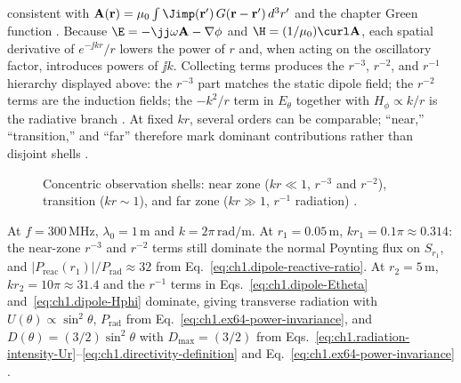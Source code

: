 consistent with $\mathbf{A}(\mathbf{r})=\mu_0\int \Jimp(\mathbf{r}')\,G(\mathbf{r}-\mathbf{r}')\,d^{3}r'$ and the chapter Green function \cite{stratton1941,harrington2001,orfanidis2014}. Because $\E=-\jj\omega\mathbf{A}-\nabla\phi$ and $\H=(1/\mu_0)\curl\mathbf{A}$, each spatial derivative of $e^{-\jj kr}/r$ lowers the power of $r$ and, when acting on the oscillatory factor, introduces powers of $\jj k$. Collecting terms produces the $r^{-3}$, $r^{-2}$, and $r^{-1}$ hierarchy displayed above: the $r^{-3}$ part matches the static dipole field; the $r^{-2}$ terms are the induction fields; the $-k^2/r$ term in $E_\theta$ together with $H_\phi\propto k/r$ is the radiative branch \cite{stratton1941}. At fixed $kr$, several orders can be comparable; ``near,'' ``transition,'' and ``far'' therefore mark dominant contributions rather than disjoint shells \cite{stratton1941,poynting1884}.

\begin{figure}[t]
\centering
\VolIPhysFig{\VolIPhysDipoleThreeZones}
\caption{Concentric observation shells: near zone ($kr\ll1$, $r^{-3}$ and $r^{-2}$), transition ($kr\sim1$), and far zone ($kr\gg1$, $r^{-1}$ radiation) \cite{stratton1941,poynting1884}.}
\label{fig:ch1.dipole-three-zones}
\end{figure}

\begin{example}
\label{ex:ch1.dipole-kr}
At $f=300\,\mathrm{MHz}$, $\lambda_0=1\,\mathrm{m}$ and $k=2\pi\,\mathrm{rad/m}$. At $r_1=0.05\,\mathrm{m}$, $kr_1=0.1\pi\approx0.314$: the near-zone $r^{-3}$ and $r^{-2}$ terms still dominate the normal Poynting flux on $S_{r_1}$, and $|P_{\mathrm{reac}}(r_1)|/P_{\mathrm{rad}}\approx32$ from Eq.~\eqref{eq:ch1.dipole-reactive-ratio}. At $r_2=5\,\mathrm{m}$, $kr_2=10\pi\approx31.4$ and the $r^{-1}$ terms in Eqs.~\eqref{eq:ch1.dipole-Etheta} and~\eqref{eq:ch1.dipole-Hphi} dominate, giving transverse radiation with $U(\theta)\propto\sin^2\theta$, $P_{\mathrm{rad}}$ from Eq.~\eqref{eq:ch1.ex64-power-invariance}, and $D(\theta)=(3/2)\sin^2\theta$ with $D_{\max}=(3/2)$ from Eqs.~\eqref{eq:ch1.radiation-intensity-Ur}--\eqref{eq:ch1.directivity-definition} and Eq.~\eqref{eq:ch1.ex64-power-invariance} \cite{stratton1941,harrington2001}.
\end{example}


